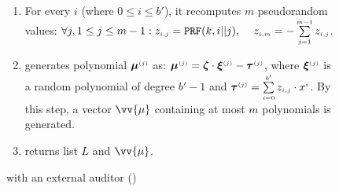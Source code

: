 \begin{figure}[ht]
\begin{center}
\begin{tcolorbox}[enhanced,width=4.78in, height=110mm,right=.5mm,
    drop fuzzy shadow southwest,
    colframe=black,colback=white]
{{\begin{enumerate}[leftmargin=-.01mm]
\begin{enumerate}[leftmargin=1.4mm]
\item\label{ZSPA-A::gen-z} For every $i$ (where $0\leq i \leq b'$), it recomputes $m$ pseudorandom values: 
%
$\forall j, 1\leq j \leq m-1: z_{\scriptscriptstyle i,j}=\mathtt{PRF}(k,i||j), \hspace{4mm} z_{\scriptscriptstyle i,m}=-\sum\limits^{\scriptscriptstyle m-1}_{\scriptscriptstyle j=1}z_{\scriptscriptstyle i,j}$.
%
 \item generates polynomial $\bm\mu^{\scriptscriptstyle (j)}$ as: 
   $\bm\mu^{\scriptscriptstyle (j)} = \bm\zeta\cdot \bm\xi^{\scriptscriptstyle (j)}-\bm\tau^{\scriptscriptstyle (j)}$, 
    where $\bm\xi^{\scriptscriptstyle (j)}$ is a random polynomial of degree $b'-1$ and $\bm\tau^{\scriptscriptstyle (j)}=\sum\limits^{\scriptscriptstyle b'}_{\scriptscriptstyle i=0}z_{\scriptscriptstyle i,j}\cdot x^{\scriptscriptstyle i}$. By this step, a vector $\vv{{\mu}}$ containing at most $m$ polynomials is generated. 
%
 \item returns   list $L$ and $\vv{{\mu}}$.
 
\end{enumerate}
 \end{enumerate}
}}
 \end{tcolorbox}
\end{center}
\vspace{-5.8mm}
\caption{\zspa with an external auditor (\zspaa)} 
\label{fig:arbiter}
\vspace{-5mm}
\end{figure}



